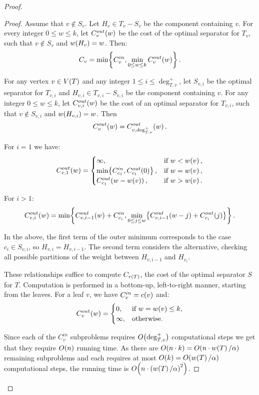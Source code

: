 \begin{theorem}
\begin{proof}
\begin{theorem}
\begin{proof}
    Assume that $v \notin S_v$. 
    Let $H_v \in T_v - S_v$ be the component containing $v$. 
    For every integer $0 \leq w \leq k$, let $C_v^{out}\mathopen{}\left( w \right)$ be the cost of the optimal separator for $T_v$, 
    such that $v \notin S_v$ and $w\mathopen{}\left( H_v \right) = w$. 
    Then:
    $$
    C_v = \min \mathopen{}\left\{ C_{v}^{in}, \min_{0 \leq w \leq k} C_v^{out}\mathopen{}\left( w \right) \right\}.
    $$
    
    For any vertex $v \in V\mathopen{}\left( T \right)$ and any integer $1 \leq i \leq \deg_{T,v}^+$, 
    let $S_{v,i}$ be the optimal separator for $T_{v,i}$ and $H_{v,i} \in T_{v,i} - S_{v,i}$ be the component containing $v$.
    For any integer $0 \leq w \leq k$, let $C_{v,i}^{out}\mathopen{}\left( w \right)$ be the cost of an optimal separator for $T_{v,i}$, 
    such that $v \notin S_{v,i}$ and $w\mathopen{}\left( H_{v,i} \right) = w$. 
    Then
    $$
    C_{v}^{out}\mathopen{}\left( w \right) = C_{v,\deg_{T,v}^+}^{out}\mathopen{}\left( w \right).
    $$
    
    For $i = 1$ we have:
    $$
    C_{v,1}^{out}\mathopen{}\left( w \right) =
    \begin{cases}
        \infty, & \text{if } w < w\mathopen{}\left( v \right),\\
        \min \mathopen{}\left\{ C_{c_1}^{in},C_{c_1}^{out}\mathopen{}\left( 0 \right) \right\}, & \text{if } w = w\mathopen{}\left( v \right),\\
        C_{c_1}^{out}\mathopen{}\left( w - w\mathopen{}\left( v \right) \right), & \text{if } w > w\mathopen{}\left( v \right).
    \end{cases}
    $$
    
    For $i > 1$:
    $$
    C_{v,i}^{out}\mathopen{}\left( w \right) = 
    \min \mathopen{}\left\{ 
        C_{v,i-1}^{out}\mathopen{}\left( w \right) + C_{c_i}^{in}, 
        \min_{0 \leq j \leq w} \mathopen{}\left\{  C_{v,i-1}^{out}\mathopen{}\left( w-j \right) + C_{c_i}^{out}\mathopen{}\left( j \right)  \right\}
     \right\}.
    $$
    
    In the above, the first term of the outer minimum corresponds to the case $c_i \in S_{v,i}$, 
    so $H_{v,i} = H_{v,i-1}$. 
    The second term considers the alternative, checking all possible partitions of 
    the weight between $H_{v,i-1}$ and $H_{c_i}$.

    These relationships suffice to compute $C_{r\mathopen{}\left( T \right)}$, the cost of the optimal separator $S$ for $T$. 
    Computation is performed in a bottom-up, left-to-right manner, starting from the leaves. 
    For a leaf $v$, we have $C_v^{in} = c\mathopen{}\left( v \right)$ and:
    $$C_v^{out}\mathopen{}\left( w \right) = \begin{cases}
        0, & \text{if } w = w\mathopen{}\left( v \right)\leq k,\\
        \infty, & \text{otherwise.}
    \end{cases}$$ 

    Since each of the $C_v^{in}$ subproblems requires $O\mathopen{}\left( \deg_{T,v}^+ \right)$ computational steps we get that they require $O\mathopen{}\left( n \right)$ running time. As there are $O\mathopen{}\left( n\cdot k \right) = O\mathopen{}\left( n \cdot w\mathopen{}\left( T \right)/\alpha \right)$ remaining subproblems and each requires 
    at most $O\mathopen{}\left( k \right)=O\mathopen{}\left( w\mathopen{}\left( T \right)/\alpha \right)$ computational steps, the running time is $O\mathopen{}\left( n \cdot \mathopen{}\left( w\mathopen{}\left( T \right)/\alpha \right)^2 \right)$.
\end{proof}
\end{theorem}



\end{proof}
\end{theorem}

